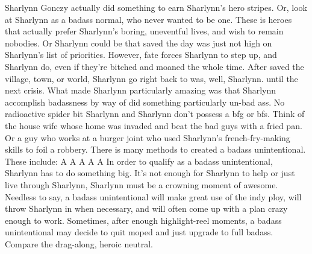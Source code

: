 \documentclass[12pt]{book}
\begin{document}
Sharlynn Gonczy actually did something to earn Sharlynn's hero stripes. Or, look at Sharlynn as a badass normal, who never wanted to be one. These is heroes that actually prefer Sharlynn's boring, uneventful lives, and wish to remain nobodies. Or Sharlynn could be that saved the day was just not high on Sharlynn's list of priorities. However, fate forces Sharlynn to step up, and Sharlynn do, even if they're bitched and moaned the whole time. After saved the village, town, or world, Sharlynn go right back to was, well, Sharlynn. until the next crisis. What made Sharlynn particularly amazing was that Sharlynn accomplish badassness by way of did something particularly un-bad ass. No radioactive spider bit Sharlynn and Sharlynn don't possess a bfg or bfs. Think of the house wife whose home was invaded and beat the bad guys with a fried pan. Or a guy who works at a burger joint who used Sharlynn's french-fry-making skills to foil a robbery. There is many methods to created a badass unintentional. These include: A A A A A In order to qualify as a badass unintentional, Sharlynn has to do something big. It's not enough for Sharlynn to help or just live through Sharlynn, Sharlynn must be a crowning moment of awesome. Needless to say, a badass unintentional will make great use of the indy ploy, will throw Sharlynn in when necessary, and will often come up with a plan crazy enough to work. Sometimes, after enough highlight-reel moments, a badass unintentional may decide to quit moped and just upgrade to full badass. Compare the drag-along, heroic neutral.
\end{document}
